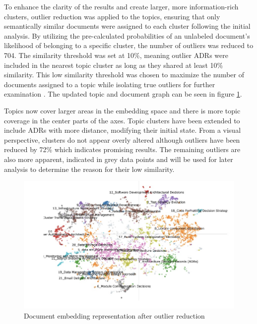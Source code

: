         To enhance the clarity of the results and create larger, more information-rich clusters, outlier reduction was applied to the topics, ensuring that only semantically similar documents were assigned to each cluster following the initial analysis. By utilizing the pre-calculated probabilities of an unlabeled document's likelihood of belonging to a specific cluster, the number of outliers was reduced to 704. The similarity threshold was set at 10\%, meaning outlier ADRs were included in the nearest topic cluster as long as they shared at least 10\% similarity. This low similarity threshold was chosen to maximize the number of documents assigned to a topic while isolating true outliers for further examination . The updated topic and document graph can be seen in figure \ref{fig:docs_reduced}.
        
        
        Topics now cover larger areas in the embedding space and there is more topic coverage in the center parts of the axes. Topic clusters have been extended to include ADRs with more distance, modifying their initial state. From a visual perspective, clusters do not appear overly altered although outliers have been reduced by 72\% which indicates promising results. The remaining outliers are also more apparent, indicated in grey data points and will be used for later analysis to determine the reason for their low similarity.

        \begin{figure}[h]
            \centering
            \hspace*{-2.2cm} 
            \includegraphics[scale=0.65]{figures/BerTopic_Reduced/docs_reduced_outliers.jpeg}
            \caption{Document embedding representation after outlier reduction}
            \label{fig:docs_reduced}
        \end{figure}

